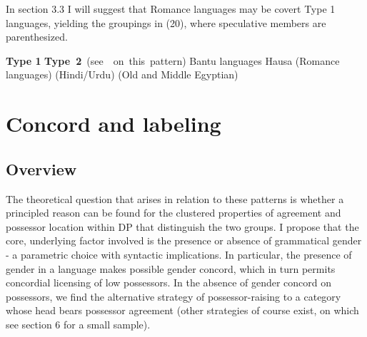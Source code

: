 \documentclass[output=paper
,modfonts
,nonflat]{langsci/langscibook}
\begin{document}
\begin{figure}[!h]
	\begin{exe}
	\end{exe}
\end{figure}
\newpage \noindent In section 3.3 I will suggest that Romance languages may be covert Type 1 languages, yielding the groupings in (20), where speculative members are parenthesized.

\begin{exe}
	\ex
\hspace{-0.05cm}\textbf{Type 1}  \mbox{\hspace{5.4cm}\textbf{Type 2} (see \citealt{Abney1987} on this pattern)}
Bantu languages  
Hausa  
(Romance languages)  
(Hindi/Urdu)  
(Old and Middle Egyptian)        
\end{exe}

\section{Concord and labeling} 
\subsection{Overview}
The theoretical question that arises in relation to these patterns is whether a principled reason can be found for the clustered properties of agreement and possessor location within DP that distinguish the two groups. I propose that the core, underlying factor involved is the presence or absence of grammatical gender - a parametric choice with syntactic implications. In particular, the presence of gender in a language makes possible gender concord, which in turn permits concordial licensing of low possessors. In the absence of gender concord on possessors, we find the alternative strategy of possessor-raising to a category whose head bears possessor agreement (other strategies of course exist, on which see section 6 for a small sample). 
\end{document}
